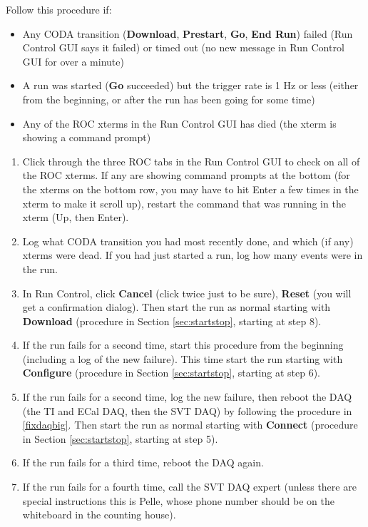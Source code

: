 \documentclass[12pt]{article}
\begin{document}
Follow this procedure if:
\begin{itemize}
\item Any CODA transition (\textbf{Download}, \textbf{Prestart}, \textbf{Go}, \textbf{End Run}) failed (Run Control GUI says it failed) or timed out (no new message in Run Control GUI for over a minute)
\item A run was started (\textbf{Go} succeeded) but the trigger rate is 1 Hz or less (either from the beginning, or after the run has been going for some time)
\item Any of the ROC xterms in the Run Control GUI has died (the xterm is showing a command prompt)
\end{itemize}
\begin{enumerate}
	\item Click through the three ROC tabs in the Run Control GUI to check on all of the ROC xterms. If any are showing command prompts at the bottom (for the xterms on the bottom row, you may have to hit Enter a few times in the xterm to make it scroll up), restart the command that was running in the xterm (Up, then Enter).
	\item Log what CODA transition you had most recently done, and which (if any) xterms were dead. If you had just started a run, log how many events were in the run. 
    \item In Run Control, click \textbf{Cancel} (click twice just to be sure), \textbf{Reset} (you will get a confirmation dialog). Then start the run as normal starting with \textbf{Download} (procedure in Section \ref{sec:startstop}, starting at step 8).
    \item If the run fails for a second time, start this procedure from the beginning (including a log of the new failure). This time start the run starting with \textbf{Configure} (procedure in Section \ref{sec:startstop}, starting at step 6).
    \item If the run fails for a second time, log the new failure, then reboot the DAQ (the TI and ECal DAQ, then the SVT DAQ) by following the procedure in \ref{fixdaqbig}. Then start the run as normal starting with \textbf{Connect} (procedure in Section \ref{sec:startstop}, starting at step 5).
    \item If the run fails for a third time, reboot the DAQ again.
    \item If the run fails for a fourth time, call the SVT DAQ expert (unless there are special instructions this is Pelle, whose phone number should be on the whiteboard in the counting house).

\end{enumerate}
\end{document}
